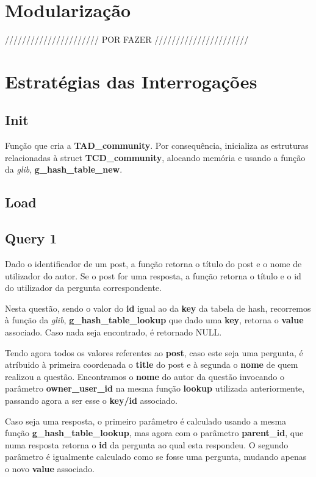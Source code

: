 \documentclass[a4paper]{article}
\begin{document}
\section{Modularização}
\label{sec:modularizacao}

////////////////////// POR FAZER //////////////////////

\section{Estratégias das Interrogações}
\label{sec:estrategias}

\subsection{Init}

Função que cria a \textbf{TAD\_community}. Por consequência, inicializa
as estruturas relacionadas à struct \textbf{TCD\_community}, alocando
memória e usando a função da \textit{glib}, \textbf{g\_hash\_table\_new}.

\subsection{Load}

\subsection{Query 1}

Dado o identificador de um post, a função retorna o título do post 
e o nome de utilizador do autor. Se o post for uma resposta, a função
retorna o título e o id do utilizador da pergunta correspondente.

Nesta questão, sendo o valor do \textbf{id} igual ao da \textbf{key} 
da tabela de hash, recorremos à função da \textit{glib},
\textbf{g\_hash\_table\_lookup} que dado uma \textbf{key},
retorna o \textbf{value} associado. Caso nada seja encontrado,
é retornado NULL.

Tendo agora todos os valores referentes ao \textbf{post}, caso este
seja uma pergunta, é atríbuido à primeira coordenada o \textbf{title}
do post e à segunda o \textbf{nome} de quem realizou a questão.
Encontramos o \textbf{nome} do autor da questão invocando o parâmetro
\textbf{owner\_user\_id} na mesma função \textbf{lookup} utilizada 
anteriormente, passando agora a ser esse o \textbf{key/id} associado.

Caso seja uma resposta, o primeiro parâmetro é calculado usando a mesma 
função \textbf{g\_hash\_table\_lookup}, mas agora com o 
parâmetro \textbf{parent\_id}, que numa resposta retorna o \textbf{id} 
da pergunta ao qual esta respondeu. O segundo parâmetro é igualmente
calculado como se fosse uma pergunta, mudando apenas o novo 
\textbf{value} associado.
\end{document}
